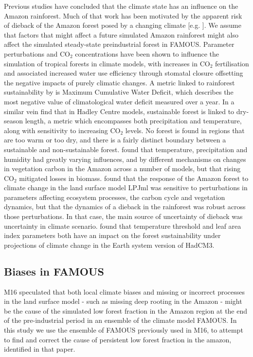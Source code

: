 \documentclass[gmd, manuscript]{copernicus}
\begin{document}
Previous studies have concluded that the climate state has an influence on the Amazon rainforest. Much of that work has been motivated by the apparent risk of dieback of the Amazon forest posed by a changing climate [e.g. \cite{malhi2008climate, cox2004amazonian}].  We assume that factors that might affect a future simulated Amazon rainforest might also affect the simulated steady-state preindustrial forest in FAMOUS. Parameter perturbations and CO$_{2}$ concentrations have been shown to influence the simulation of tropical forests in climate models, with increases in CO$_{2}$ fertilisation and associated increased water use efficiency through stomatal closure offsetting the negative impacts of purely climatic changes. A metric linked to rainforest sustainability by \cite{malhi2009exploring} is Maximum Cumulative Water Deficit, which describes the most negative value of climatological water deficit measured over a year. In a similar vein \cite{Good2011, Good2013} find that in Hadley Centre models, sustainable forest is linked to dry-season length, a metric which encompasses both precipitation and temperature, along with sensitivity to increasing CO$_{2}$ levels. No forest is found in regions that are too warm or too dry, and there is a fairly distinct boundary between a sustainable and non-sustainable forest. \cite{Galbraith2010} found that temperature, precipitation and humidity had greatly varying influences, and by different mechanisms on changes in vegetation carbon in the Amazon across a number of models, but that rising CO$_{2}$ mitigated losses in biomass. \cite{POULTER2010} found that the response of the Amazon forest to climate change in the land surface model LPJml was sensitive to perturbations in parameters affecting ecosystem processes, the carbon cycle and vegetation dynamics, but that the dynamics of a dieback in the rainforest was robust across those perturbations. In that case, the main source of uncertainty of dieback was uncertainty in climate scenario. \cite{boulton2017exploring} found that temperature threshold and leaf area index parameters both have an impact on the forest sustainability under projections of climate change in the Earth system version of HadCM3.


\subsection{Biases in FAMOUS}\label{ssec:biases}

M16 speculated that both local climate biases and missing or incorrect processes in the land surface model - such as missing deep rooting in the Amazon - might be the cause of the simulated low forest fraction in the Amazon region at the end of the pre-industrial period in an ensemble of the climate model FAMOUS. In this study we use the ensemble of FAMOUS previously used in M16, to attempt to find and correct the cause of persistent low forest fraction in the amazon, identified in that paper. 
\end{document}

